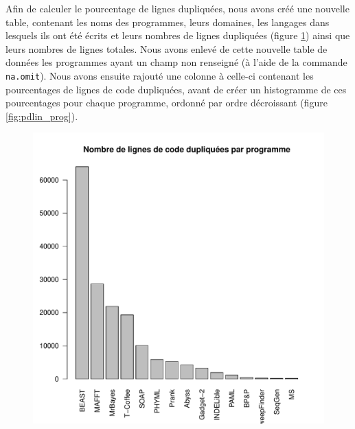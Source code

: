 Afin de calculer le pourcentage de lignes dupliquées, nous avons créé
une nouvelle table, contenant les noms des programmes, leurs
domaines, les langages dans lesquels ils ont été écrits et leurs
nombres de lignes dupliquées (figure \ref{fig:dlin_prog}) ainsi que
leurs nombres de lignes totales. Nous avons enlevé de cette nouvelle
table de données les programmes ayant un champ non renseigné (à
l'aide de la commande \lstinline{na.omit}). Nous avons ensuite rajouté une
colonne à celle-ci contenant les pourcentages de lignes de code
dupliquées, avant de créer un histogramme de ces pourcentages pour
chaque programme, ordonné par ordre décroissant (figure
\ref{fig:pdlin_prog}).

\begin{figure}[h]
  \includegraphics[width=\linewidth]{figures/dlin_prog.pdf}
  \caption{}\label{fig:dlin_prog}
  \endminipage\hfill

\end{figure}
